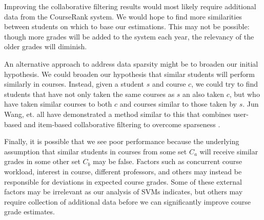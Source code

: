 Improving the collaborative filtering results would most likely require additional data from the CourseRank system.  We would hope to find more similarities between students on which to base our estimations.  This may not be possible: though more grades will be added to the system each year, the relevancy of the older grades will diminish.

An alternative approach to address data sparsity might be to broaden our initial hypothesis.  We could broaden our hypothesis that similar students will perform similarly in courses.  Instead, given a student $s$ and course $c$, we could try to find students that have not only taken the same courses as $s$ an also taken $c$, but who have taken similar courses to both $c$ and courses similar to those taken by $s$.  Jun Wang, et. all have demonstrated a method similar to this that combines user-based and item-based collaborative filtering to overcome sparseness \cite{fusion}.  

Finally, it is possible that we see poor performance because the underlying assumption that similar students in courses from some set $C_a$ will receive similar grades in some other set $C_b$ may be false.  Factors such as concurrent course workload, interest in course, different professors, and others may instead be responsible for deviations in expected course grades.  Some of these external factors may be irrelevant as our analysis of SVMs indicates, but others may require collection of additional data before we can significantly improve course grade estimates.
